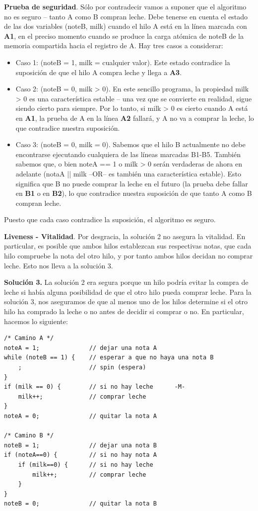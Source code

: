 \documentclass[10pt]{book}
\begin{document}
\textbf{Prueba de seguridad}. Sólo por contradecir vamos a suponer que el algoritmo no es seguro -- tanto A como B compran leche. Debe tenerse en cuenta el estado de las dos variables ({\mf noteB}, {\mf milk}) cuando el hilo A está en la línea marcada con \textbf{A1}, en el preciso momento cuando se produce la carga atómica de {\mf noteB} de la memoria compartida hacia el registro de A. Hay tres casos a considerar:
\begin{itemize}
\item Caso 1: ({\mf noteB = 1, milk = cualquier valor}). Este estado contradice la suposición de que el hilo A compra leche y llega a \textbf{A3}.
\item Caso 2: ({\mf noteB = 0, milk > 0}). En este sencillo programa, la propiedad {\mf milk > 0} es una característica estable -- una vez que se convierte en realidad, sigue siendo cierto para siempre. Por lo tanto, si {\mf milk > 0} es cierto cuando A está en \textbf{A1}, la prueba de A en la línea \textbf{A2} fallará, y A no va a comprar la leche, lo que contradice nuestra suposición.
\item Caso 3: ({\mf noteB = 0, milk = 0}). Sabemos que el hilo B actualmente no debe encontrarse ejecutando cualquiera de las líneas marcadas {\mf B1-B5}. También sabemos que, o bien {\mf noteA == 1} o {\mf milk > 0} serán verdaderas de ahora en adelante (notaA || milk --OR-- es también una característica estable). Esto significa que B no puede comprar la leche en el futuro (la prueba debe fallar en \textbf{B1} o en \textbf{B2}), lo que contradice nuestra suposición de que tanto A como B compran leche.
\end{itemize}

Puesto que cada caso contradice la suposición, el algoritmo es seguro.

\textbf{Liveness - Vitalidad}. Por desgracia, la solución 2 no asegura la vitalidad. En particular, es posible que ambos hilos  establezcan sus respectivas notas, que cada hilo compruebe la nota del otro hilo, y por tanto ambos hilos decidan no comprar leche. Esto nos lleva a la solución 3.

\textbf{Solución 3.} La solución 2 era segura porque un hilo podría evitar la compra de leche si había alguna posibilidad de que el otro hilo pueda comprar leche. Para la solución 3, nos aseguramos de que al menos uno de los hilos determine si el otro hilo ha comprado la leche o no antes de decidir si comprar o no. En particular, hacemos lo siguiente:

\begin{lstlisting}
/* Camino A */
noteA = 1; 				// dejar una nota A
while (noteB == 1) { 	// esperar a que no haya una nota B
	;					// spin (espera)
}
if (milk == 0) {		// si no hay leche		-M-
	milk++;				// comprar leche
}
noteA = 0;				// quitar la nota A

/* Camino B */
noteB = 1;				// dejar una nota B
if (noteA==0) {			// si no hay nota A
	if (milk==0) { 		// si no hay leche
		milk++;			// comprar leche
	}
}
noteB = 0;				// quitar la nota B
\end{lstlisting}
\end{document}
